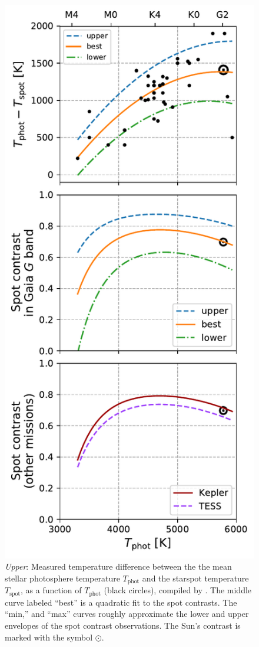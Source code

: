 \begin{figure}
\includegraphics[scale=0.85]{gaia/contrasts.pdf}
\caption{{\sl Upper}: Measured temperature difference between the the mean stellar photosphere temperature $T_{\mathrm{phot}}$ and the starspot temperature $T_{\mathrm{spot}}$, as a function of $T_{\mathrm{phot}}$ (black circles), compiled by \citet{Berdyugina2005}. The middle curve labeled ``best'' is a quadratic fit to the spot contrasts. The  ``min,'' and ``max'' curves roughly approximate the lower and upper envelopes of the spot contrast observations. The Sun's contrast is marked with the symbol $\odot$. 
}
\end{figure}

